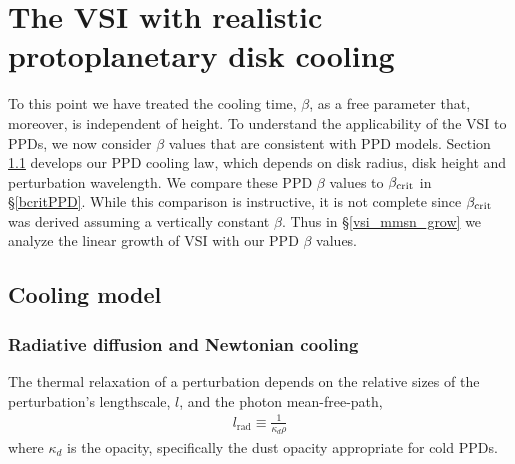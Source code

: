\section{The VSI with realistic  protoplanetary disk cooling}\label{application} 
To this point we have treated the cooling time, $\beta$, as a free parameter that, moreover, is independent of height. 
To understand the applicability of the VSI to PPDs, we now consider $\beta$ values that are consistent with PPD models.
Section \ref{cooling_model}  develops our PPD cooling law, which depends on disk radius, disk height and perturbation wavelength.
We compare these PPD $\beta$ values to $\beta_{\rm crit}$ in \S\ref{bcritPPD}.  While this comparison is instructive, it is not complete since $\beta_{\rm crit}$ was derived assuming a vertically constant $\beta$.  Thus in \S\ref{vsi_mmsn_grow} we analyze the linear growth of VSI with our PPD $\beta$ values.



\subsection{Cooling model} \label{cooling_model}

\subsubsection{Radiative diffusion and Newtonian cooling}
The thermal relaxation of a perturbation depends on the relative sizes of the perturbation's 
lengthscale, $l$, and the photon mean-free-path,
\begin{align}\label{lrad}
  l_\mathrm{rad} \equiv \frac{1}{\kappa_d\rho} 
\end{align}
where $\kappa_d$ is the opacity, specifically the dust opacity appropriate for cold PPDs. 

